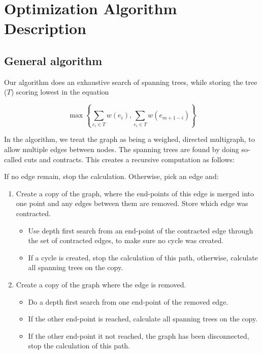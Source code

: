 
\section{Optimization Algorithm Description}

\subsection{General algorithm}
Our algorithm does an exhaustive search of spanning trees, while storing the tree ($T$) scoring lowest in the equation

$$
\max \left\{ \sum_{e_i \in T} w(e_i), \sum_{e_i \in T} w(e_{m+1-i}) \right\}
$$

In the algorithm, we treat the graph as being a weighed, directed multigraph, to allow multiple edges between nodes.
The spanning trees are found by doing so-called cuts and contracts.  This creates a recursive computation as follows:

\vspace{0.5cm}
\noindent
If no edge remain, stop the calculation. Otherwise, pick an edge and:

\begin{enumerate}
\item Create a copy of the graph, where the end-points of this edge is merged into one point and any edges between them are removed. Store which edge was contracted.

\begin{itemize}
\item Use depth first search from an end-point of the contracted edge through the set of contracted edges, to make sure no cycle was created. 

\item If a cycle is created, stop the calculation of this path, otherwise, calculate all spanning trees on the copy.
\end{itemize}

\item Create a copy of the graph where the edge is removed.
\begin{itemize}
\item Do a depth first search from one end-point of the removed edge.

\item If the other end-point is reached, calculate all spanning trees on the copy.

\item If the other end-point it not reached, the graph has been disconnected, stop the calculation of this path.
\end{itemize}
\end{enumerate} 

